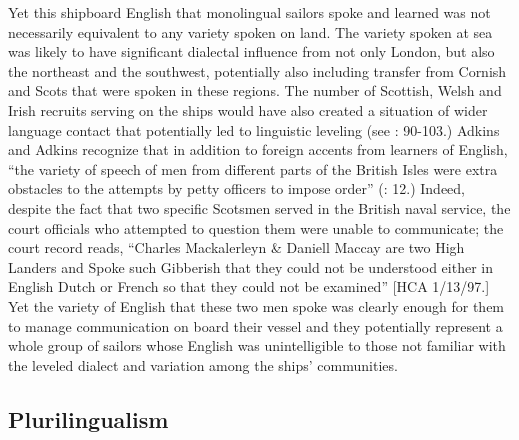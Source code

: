 Yet this shipboard English that monolingual sailors spoke and learned was not necessarily equivalent to any variety spoken on land. The variety spoken at sea was likely to have significant dialectal influence from not only London, but also the northeast and the southwest, potentially also including transfer from Cornish and Scots that were spoken in these regions. The number of Scottish, Welsh and Irish recruits serving on the ships would have also created a situation of wider language contact that potentially led to linguistic leveling (see \citealt{Trudgill1986}: 90-103.) Adkins and Adkins recognize that in addition to foreign accents from learners of English, “the variety of speech of men from different parts of the British Isles were extra obstacles to the attempts by petty officers to impose order” (\citealt{AdkinsAdkins2008}: 12.) Indeed, despite the fact that two specific Scotsmen served in the British naval service, the court officials who attempted to question them were unable to communicate; the court record reads, “Charles Mackalerleyn \& Daniell Maccay are two High Landers and Spoke such Gibberish that they could not be understood either in English Dutch or French so that they could not be examined” [HCA 1/13/97.] Yet the variety of English that these two men spoke was clearly enough for them to manage communication on board their vessel and they potentially represent a whole group of sailors whose English was unintelligible to those not familiar with the leveled dialect and variation among the ships’ communities. 

\subsection{\textbf{Plurilingualism}}%

